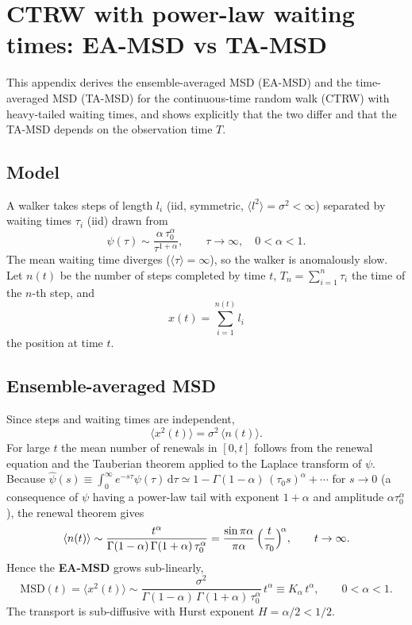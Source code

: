 \chapter{CTRW with power-law waiting times: EA-MSD vs TA-MSD}
\label{app:ctrw}

This appendix derives the ensemble-averaged MSD (EA-MSD) and the time-averaged MSD
(TA-MSD) for the continuous-time random walk (CTRW) with heavy-tailed waiting times, and
shows explicitly that the two differ and that the TA-MSD depends on the observation time
$T$.

\section*{Model}

A walker takes steps of length $l_i$ (iid, symmetric, $\langle l^2\rangle=\sigma^2<\infty$)
separated by waiting times $\tau_i$ (iid) drawn from
\begin{equation}
  \psi(\tau)\sim \frac{\alpha\,\tau_0^\alpha}{\tau^{1+\alpha}}, \qquad \tau\to\infty,
  \quad 0<\alpha<1 .
\end{equation}
The mean waiting time diverges ($\langle\tau\rangle=\infty$), so the walker is anomalously
slow. Let $n(t)$ be the number of steps completed by time $t$, $T_n=\sum_{i=1}^n\tau_i$ the
time of the $n$-th step, and
\begin{equation}
  x(t)=\sum_{i=1}^{n(t)} l_i
\end{equation}
the position at time $t$.

\section*{Ensemble-averaged MSD}

Since steps and waiting times are independent,
\begin{equation}
  \langle x^2(t)\rangle = \sigma^2\,\langle n(t)\rangle .
\end{equation}
For large $t$ the mean number of renewals in $[0,t]$ follows from the renewal equation and
the Tauberian theorem applied to the Laplace transform of $\psi$. Because
$\hat\psi(s)\equiv\int_0^\infty e^{-s\tau}\psi(\tau)\,\mathrm{d}\tau \simeq
1-\Gamma(1-\alpha)\,(\tau_0 s)^\alpha+\cdots$ for $s\to 0$ (a consequence of $\psi$
having a power-law tail with exponent $1+\alpha$ and amplitude $\alpha\tau_0^\alpha$), the
renewal theorem gives
\begin{equation}
  \langle n(t)\rangle \sim
  \frac{t^\alpha}{\Gamma(1-\alpha)\,\Gamma(1+\alpha)\,\tau_0^\alpha}
  = \frac{\sin\pi\alpha}{\pi\alpha}\,\Bigl(\frac{t}{\tau_0}\Bigr)^{\!\alpha},
  \qquad t\to\infty .
\end{equation}
Hence the \textbf{EA-MSD} grows sub-linearly,
\begin{equation}
  \mathrm{MSD}(t) = \langle x^2(t)\rangle
  \sim \frac{\sigma^2}{\Gamma(1-\alpha)\,\Gamma(1+\alpha)\,\tau_0^\alpha}\,t^\alpha
  \equiv K_\alpha\,t^\alpha , \qquad 0<\alpha<1 .
  \label{eq:ctrw-enmsd}
\end{equation}
The transport is sub-diffusive with Hurst exponent $H=\alpha/2<1/2$.

